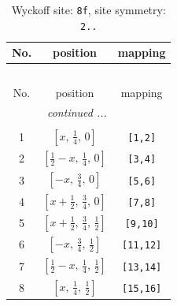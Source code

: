 \documentclass[fleqn,8pt]{jsarticle}
\begin{document}
\begin{longtable}{ccc}
\caption{Wyckoff site: {\tt 8f}, site symmetry: {\tt 2..}}
 \\
 \hline \hline
No. & position & mapping \\ \hline \endfirsthead

\multicolumn{2}{l}{\tablename\ \thetable{}} \\
 \hline \hline
No. & position & mapping \\ \hline \endhead

 \hline \hline
\multicolumn{2}{r}{\footnotesize\it continued ...} \\ \endfoot

 \hline \hline
\multicolumn{2}{r}{} \\ \endlastfoot

1 & $\left[ x,\, \frac{1}{4},\, 0 \right]$ & {\tt [1,2]} \\ \hline
2 & $\left[ \frac{1}{2} - x,\, \frac{1}{4},\, 0 \right]$ & {\tt [3,4]} \\ \hline
3 & $\left[ - x,\, \frac{3}{4},\, 0 \right]$ & {\tt [5,6]} \\ \hline
4 & $\left[ x + \frac{1}{2},\, \frac{3}{4},\, 0 \right]$ & {\tt [7,8]} \\ \hline
5 & $\left[ x + \frac{1}{2},\, \frac{3}{4},\, \frac{1}{2} \right]$ & {\tt [9,10]} \\ \hline
6 & $\left[ - x,\, \frac{3}{4},\, \frac{1}{2} \right]$ & {\tt [11,12]} \\ \hline
7 & $\left[ \frac{1}{2} - x,\, \frac{1}{4},\, \frac{1}{2} \right]$ & {\tt [13,14]} \\ \hline
8 & $\left[ x,\, \frac{1}{4},\, \frac{1}{2} \right]$ & {\tt [15,16]} \\
\end{longtable}
\renewcommand{\arraystretch}{1.2}
\end{document}
